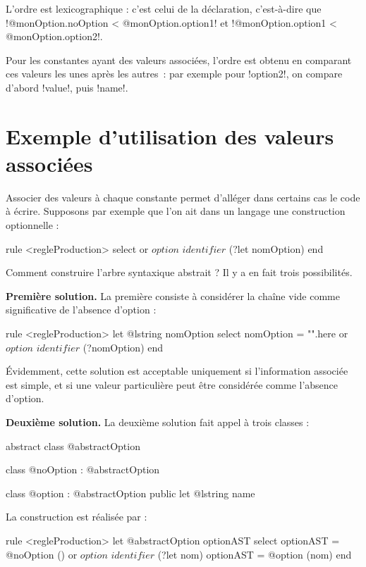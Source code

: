 L'ordre est lexicographique : c'est celui de la déclaration, c'est-à-dire que \ggsq!@monOption.noOption < @monOption.option1! et \ggsq!@monOption.option1 < @monOption.option2!.

Pour les constantes ayant des valeurs associées, l'ordre est obtenu en comparant ces valeurs les unes après les autres~: par exemple pour \ggsq!option2!, on compare d'abord \ggsq!value!, puis \ggsq!name!. 









\section{Exemple d'utilisation des valeurs associées}

Associer des valeurs à chaque constante permet d'alléger dans certains cas le code à écrire. Supposons par exemple que l'on ait dans un langage une construction optionnelle :

\begin{galgas34}
rule <regleProduction> {
  select
  or
    $option$
    $identifier$ (?let nomOption)
  end
}
\end{galgas34}

Comment construire l'arbre syntaxique abstrait ? Il y a en fait trois possibilités.

\textbf{Première solution.} La première consiste à considérer la chaîne vide comme significative de l'absence d'option :
\begin{galgas34}
rule <regleProduction> {
  let @lstring nomOption
  select
    nomOption = "".here
  or
    $option$
    $identifier$ (?nomOption)
  end
}
\end{galgas34}

Évidemment, cette solution est acceptable uniquement si l'information associée est simple, et si une valeur particulière peut être considérée comme l'absence d'option.

\textbf{Deuxième solution.} La deuxième solution fait appel à trois classes :
\begin{galgas4}
abstract class @abstractOption {}

class @noOption : @abstractOption {}

class @option : @abstractOption { public let @lstring name }
\end{galgas4}

La construction est réalisée par :
\begin{galgas4}
rule <regleProduction> {
  let @abstractOption optionAST
  select
    optionAST = @noOption ()
  or
    $option$
    $identifier$ (?let nom)
    optionAST = @option (nom)
  end
}
\end{galgas4}

